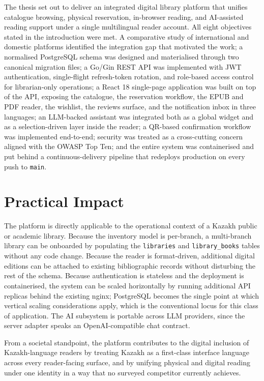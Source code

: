 \documentclass[12pt,a4paper]{report}
\begin{document}
The thesis set out to deliver an integrated digital library platform
that unifies catalogue browsing, physical reservation, in-browser
reading, and AI-assisted reading support under a single multilingual
reader account. All eight objectives stated in the introduction were
met. A comparative study of international and domestic platforms
identified the integration gap that motivated the work; a normalised
PostgreSQL schema was designed and materialised through two canonical
migration files; a Go/Gin REST API was implemented with JWT
authentication, single-flight refresh-token rotation, and role-based
access control for librarian-only operations; a React 18 single-page
application was built on top of the API, exposing the catalogue, the
reservation workflow, the EPUB and PDF reader, the wishlist, the
reviews surface, and the notification inbox in three languages; an
LLM-backed assistant was integrated both as a global widget and as a
selection-driven layer inside the reader; a QR-based confirmation
workflow was implemented end-to-end; security was treated as a
cross-cutting concern aligned with the OWASP Top Ten; and the entire
system was containerised and put behind a continuous-delivery
pipeline that redeploys production on every push to \texttt{main}.

\section{Practical Impact}

The platform is directly applicable to the operational context of a
Kazakh public or academic library. Because the inventory model is
per-branch, a multi-branch library can be onboarded by populating
the \texttt{libraries} and \texttt{library\_books} tables without any
code change. Because the reader is format-driven, additional digital
editions can be attached to existing bibliographic records without
disturbing the rest of the schema. Because authentication is
stateless and the deployment is containerised, the system can be
scaled horizontally by running additional API replicas behind the
existing nginx; PostgreSQL becomes the single point at which
vertical scaling considerations apply, which is the conventional
locus for this class of application. The AI subsystem is portable
across LLM providers, since the server adapter speaks an
OpenAI-compatible chat contract.

From a societal standpoint, the platform contributes to the digital
inclusion of Kazakh-language readers by treating Kazakh as a
first-class interface language across every reader-facing surface,
and by unifying physical and digital reading under one identity in a
way that no surveyed competitor currently achieves.
\end{document}
